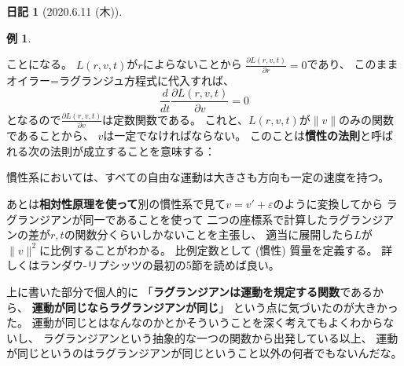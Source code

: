 \documentclass[uplatex]{jsarticle}
\theoremstyle{definition}
\newtheorem*{exam*}{例}
\newtheorem*{nikki*}{日記}
\def\ep{\varepsilon}
\begin{document}
\begin{nikki*}[2020.6.11 (木)]
\begin{exam*}
\begin{center}
    \end{center}
    ことになる。
    \(L(r,v,t)\)が\(r\)によらないことから
    \(\frac{\partial L(r,v,t)}{\partial r}=0\)であり、
    このままオイラー=ラグランジュ方程式に代入すれば、
    \[
    \frac{d}{dt}\frac{\partial L(r,v,t)}{\partial v} = 0
    \]
    となるので\(\frac{\partial L(r,v,t)}{\partial v}\)は定数関数である。
    これと、\(L(r,v,t)\)が\(\|v\|\)のみの関数であることから、
    \(v\)は一定でなければならない。
    このことは\textbf{慣性の法則}と呼ばれる次の法則が成立することを意味する：
    \begin{center}
      慣性系においては、すべての自由な運動は大きさも方向も一定の速度を持つ。
    \end{center}
    あとは\textbf{相対性原理を使って}別の慣性系で見て\(v=v'+\ep\)のように変換してから
    ラグランジアンが同一であることを使って
    二つの座標系で計算したラグランジアンの差が\(r,t\)の関数分くらいしかないことを主張し、
    適当に展開したら\(L\)が\(\|v\|^2\)に比例することがわかる。
    比例定数として (慣性) 質量を定義する。
    詳しくはランダウ-リプシッツの最初の5節を読めば良い。
  \end{exam*}
  上に書いた部分で個人的に
  「\textbf{ラグランジアンは運動を規定する関数}であるから、
  \textbf{運動が同じならラグランジアンが同じ}」
  という点に気づいたのが大きかった。
  運動が同じとはなんなのかとかそういうことを深く考えてもよくわからないし、
  ラグランジアンという抽象的な一つの関数から出発している以上、
  運動が同じというのはラグランジアンが同じということ以外の何者でもないんだな。
\end{nikki*}
\end{document}
